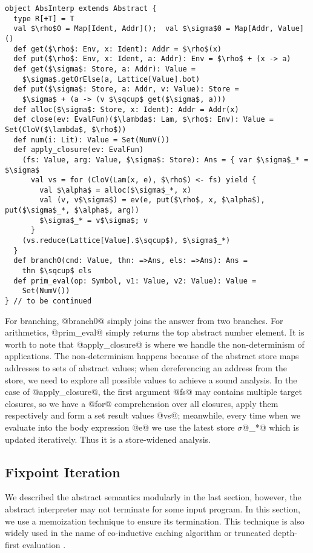\begin{lstlisting}
object AbsInterp extends Abstract {
  type R[+T] = T
  val $\rho$0 = Map[Ident, Addr]();  val $\sigma$0 = Map[Addr, Value]()
  def get($\rho$: Env, x: Ident): Addr = $\rho$(x)
  def put($\rho$: Env, x: Ident, a: Addr): Env = $\rho$ + (x -> a)
  def get($\sigma$: Store, a: Addr): Value = 
    $\sigma$.getOrElse(a, Lattice[Value].bot)
  def put($\sigma$: Store, a: Addr, v: Value): Store =
    $\sigma$ + (a -> (v $\sqcup$ get($\sigma$, a)))
  def alloc($\sigma$: Store, x: Ident): Addr = Addr(x)
  def close(ev: EvalFun)($\lambda$: Lam, $\rho$: Env): Value = Set(CloV($\lambda$, $\rho$))
  def num(i: Lit): Value = Set(NumV())
  def apply_closure(ev: EvalFun)
    (fs: Value, arg: Value, $\sigma$: Store): Ans = { var $\sigma$_* = $\sigma$
      val vs = for (CloV(Lam(x, e), $\rho$) <- fs) yield {
        val $\alpha$ = alloc($\sigma$_*, x)
        val (v, v$\sigma$) = ev(e, put($\rho$, x, $\alpha$), put($\sigma$_*, $\alpha$, arg))
        $\sigma$_* = v$\sigma$; v
      }
    (vs.reduce(Lattice[Value].$\sqcup$), $\sigma$_*)
  }
  def branch0(cnd: Value, thn: =>Ans, els: =>Ans): Ans = 
    thn $\sqcup$ els
  def prim_eval(op: Symbol, v1: Value, v2: Value): Value = 
    Set(NumV())
} // to be continued
\end{lstlisting}

For branching, @branch0@ simply joins the answer from two branches. For arithmetics, @prim_eval@ simply 
returns the top abstract number element.
It is worth to note that @apply_closure@ is where we handle the non-determinism of applications.
The non-determinism happens because of the abstract store maps addresses to sets of abstract values;
when dereferencing an address from the store, we need to explore all possible values to achieve a sound 
analysis. In the case of @apply_closure@, the first argument @fs@ may contains multiple target closures,
so we have a @for@ comprehension over all closures, apply them respectively and form a set result values @vs@;
meanwhile, every time when we evaluate into the body expression @e@ we use the latest store $\sigma$@_*@
which is updated iteratively. Thus it is a store-widened analysis.


\subsection{Fixpoint Iteration}
We described the abstract semantics modularly in the last section, however, the abstract 
interpreter may not terminate for some input program. In this section, we use a memoization
technique to ensure its termination. This technique is also widely used in the name of co-inductive caching algorithm
\cite{DBLP:journals/pacmpl/DaraisLNH17, Wei:2018:RAA:3243631.3236800} or truncated depth-first evaluation 
\cite{Rosendahl:AbsIntPL}.

